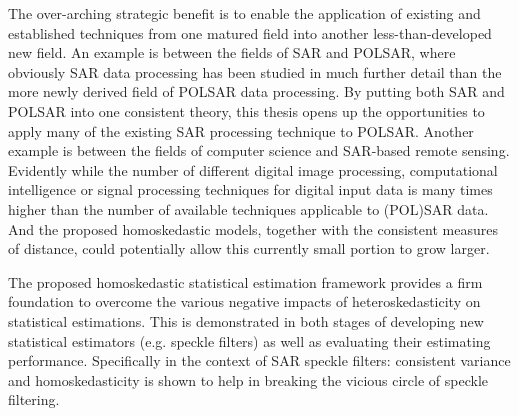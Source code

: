 The over-arching strategic benefit is to enable the application of existing and established techniques from one matured field into another less-than-developed new field.
An example is between the fields of SAR and POLSAR, where obviously SAR data processing has been studied in much further detail than the more newly derived field of POLSAR data processing.
By putting both SAR and POLSAR into one consistent theory, this thesis opens up the opportunities to apply many of the existing SAR processing technique to POLSAR.
Another example is between the fields of computer science and SAR-based remote sensing.
Evidently while the number of different digital image processing, computational intelligence or signal processing techniques for digital input data is many times higher than the number of available techniques applicable to (POL)SAR data.
And the proposed homoskedastic models, together with the consistent measures of distance,  %
could potentially allow this currently small portion to grow larger.

The proposed homoskedastic statistical estimation framework provides a firm foundation
to overcome the various negative impacts of heteroskedasticity on statistical estimations.
This
                is demonstrated in both stages of developing new
                statistical estimators (e.g. speckle filters) as well as evaluating their estimating performance.
Specifically
                in the context of SAR speckle filters: consistent
                variance and homoskedasticity is shown to help in
                breaking the vicious circle of speckle filtering.

